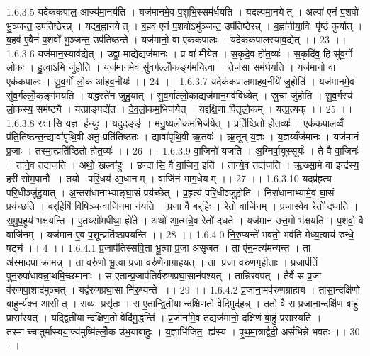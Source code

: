 1.6.3.5
यदेक॑कपाल॒ आज्य॑मा॒नय॑ति । यज॑मानमे॒व प॒शुभि॒स्सम॑र्धयति । यदल्प॑मा॒नयेत् । अल्पा॑ एनं प॒शवो॑ भु॒ञ्जन्त॒ उप॑तिष्ठेरन्न् । यद्ब॒ह्वा॑नयेत् । ब॒हव॑ एनं प॒शवोऽभु॑ञ्जन्त॒ उप॑तिष्ठेरन्न् । ब॒ह्वा॑नीया॒वि पृ॑ष्ठं कुर्यात् । ब॒हव॑ ए॒वैनं॑ प॒शवो॑ भु॒ञ्जन्त॒ उप॑तिष्ठन्ते । यज॑मानो॒ वा एक॑कपालः । यदेक॑कपालस्याव॒द्येत् ।। 23 ।।
1.6.3.6
यज॑मान॒स्याव॑द्येत् । उद्वा॒ माद्ये॒द्यज॑मानः । प्र वा॑ मीयेत । स॒कृदे॒व हो॑त॒व्यः॑ । स॒कृदि॑व॒ हि सु॑व॒र्गो लो॒कः । हु॒त्वाऽभि जु॑होति । यज॑मानमे॒व सु॑व॒र्गल्लोँ॒कङ्ग॑मयि॒त्वा । तेज॑सा॒ सम॑र्धयति । यज॑मानो॒ वा एक॑कपालः । सु॒व॒र्गो लो॒क आ॑हव॒नीयः॑ ।। 24 ।।
1.6.3.7
यदेक॑कपालमाहव॒नीये॑ जु॒होति॑ । यज॑मानमे॒व सु॑व॒र्गल्लोँ॒कङ्ग॑मयति । यद्धस्ते॑न जुहु॒यात् । सु॒व॒र्गाल्लो॒काद्यज॑मान॒मव॑विध्येत् । स्रु॒चा जु॑होति । सु॒व॒र्गस्य॑ लो॒कस्य॒ सम॑ष्ट्यै । यत्प्राङ्पद्ये॑त । दे॒व॒लो॒कम॒भिज॑येत् । यद्द॑क्षि॒णा पि॑तृलो॒कम् । यत्प्र॒त्यक् ।। 25 ।।
1.6.3.8
रक्षा॑सि य॒ज्ञ ह॑न्युः । यदुदङ्ङ्॑ । म॒नु॒ष्य॒लो॒कम॒भिज॑येत् । प्रति॑ष्ठितो होत॒व्यः॑ । एक॑कपाल॒व्वैँ प्र॑ति॒तिष्ठ॑न्त॒न्द्यावा॑पृथि॒वी अनु॒ प्रति॑तिष्ठतः । द्यावा॑पृथि॒वी ऋ॒तवः॑ । ऋ॒तून् य॒ज्ञः । य॒ज्ञय्यँज॑मानः । यज॑मानं प्र॒जाः । तस्मा॒त्प्रति॑ष्ठितो होत॒व्यः॑ ।। 26 ।।
1.6.3.9
वा॒जिनो॑ यजति । अ॒ग्निर्वा॒युस्सूर्यः॑ । ते वै वा॒जिनः॑ । ताने॒व तद्य॑जति । अथो॒ खल्वा॑हुः । छन्दा॑सि॒ वै वा॒जिन॒ इति॑ । तान्ये॒व तद्य॑जति । ऋ॒ख्सा॒मे वा इन्द्र॑स्य॒ हरी॑ सोम॒पानौ । तयो परि॒धय॑ आ॒धानम् । वाजि॑नं भाग॒धेयम् ।। 27 ।।
1.6.3.10
यदप्र॑हृत्य परि॒धीञ्जु॑हु॒यात् । अ॒न्तरा॑धानाभ्याङ्घा॒सं प्रय॑च्छेत् । प्र॒हृत्य॑ परि॒धीञ्जु॑होति । निरा॑धानाभ्यामे॒व घा॒सं प्रय॑च्छति । ब॒र्॒हिषि॑ विषि॒ञ्चन्वाजि॑न॒मा न॑यति । प्र॒जा वै ब॒र्॒हिः । रेतो॒ वाजि॑नम् । प्र॒जास्वे॒व रेतो॑ दधाति । स॒मु॒प॒हूय॑ भक्षयन्ति । ए॒तथ्सो॑मपीथा॒ ह्ये॑ते । अथो॑ आ॒त्मन्ने॒व रेतो॑ दधते । यज॑मान उत्त॒मो भ॑क्षयति । प॒शवो॒ वै वाजि॑नम् । यज॑मान ए॒व प॒शून्प्रति॑ष्ठापयन्ति ।। 28 ।।
1.6.4.0
नि॒रु॒प्यन्ते॑ भवतो॒ भव॑ति मेध्य॒त्वाय॑ रुन्धे॒ षट्च॑ ।। 4 ।।
1.6.4.1
प्र॒जाप॑तिस्सवि॒ता भू॒त्वा प्र॒जा अ॑सृजत । ता ए॑न॒मत्य॑मन्यन्त । ता अ॑स्मा॒दपाक्रामन्न् । ता वरु॑णो भू॒त्वा प्र॒जा वरु॑णेनाग्राहयत् । ता प्र॒जा वरु॑णगृहीताः । प्र॒जाप॑तिं॒ पुन॒रुपा॑धावन्ना॒थमि॒च्छमा॑नाः । स ए॒तान्प्र॒जाप॑तिर्वरुणप्रघा॒सान॑पश्यत् । तान्निर॑वपत् । तैर्वै स प्र॒जा व॑रुणपा॒शाद॑मुञ्चत् । यद्व॑रुणप्रघा॒सा नि॑रु॒प्यन्ते ।। 29 ।।
1.6.4.2
प्र॒जाना॒मव॑रुणग्राहाय । तासा॒न्दक्षि॑णो बा॒हुर्न्य॑क्न॒ आसीत् । स॒व्य प्रसृ॑तः । स ए॒तान्द्वि॒तीयान्दक्षिण॒तो वेदि॒मुद॑हन्न् । ततो॒ वै स प्र॒जाना॒न्दक्षि॑णं बा॒हुं प्रासा॑रयत् । यद्द्वि॒तीयान्दक्षिण॒तो वेदि॑मु॒द्धन्ति॑ । प्र॒जाना॑मे॒व तद्यज॑मानो॒ दक्षि॑णं बा॒हुं प्रसा॑रयति । तस्माच्चातुर्मास्यया॒ज्य॑मुष्मि॑ल्लोँ॒क उ॑भ॒याबा॑हुः । य॒ज्ञाभि॑जित॒॒ ह्य॑स्य । पृ॒थ॒मा॒त्राद्वैदी॒ असं॑भिन्ने भवतः ।। 30 ।।
